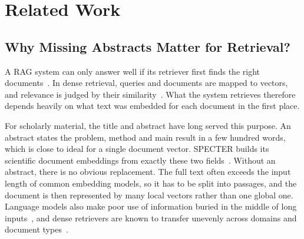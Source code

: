 \documentclass[bdcc,article,submit,pdftex,moreauthors]{Definitions/mdpi}
\begin{document}

\section{Related Work}
\label{sec:related_work}

\subsection{Why Missing Abstracts Matter for Retrieval?}

A RAG system can only answer well if its retriever first finds the right documents~\citep{lewis2020retrieval}. In dense retrieval, queries and documents are mapped to vectors, and relevance is judged by their similarity~\citep{karpukhin2020dense,reimers2019sentence}. 
What the system retrieves therefore depends heavily on what text was embedded for each document in the first place.

For scholarly material, the title and abstract have long served this purpose. An abstract states the problem, method and main result in a few hundred words, which is close to ideal for a single document vector. SPECTER builds its scientific document embeddings from exactly these two fields~\citep{cohan2020specter}. Without an abstract, there is no obvious replacement. The full text often exceeds the input length of common embedding models, so it has to be split into passages, and the document is then represented by many local vectors rather than one global one. Language models also make poor use of information buried in the middle of long inputs~\citep{liu2024lost}, and dense retrievers are known to transfer unevenly across domains and document types~\citep{thakur2021beir}.
\end{document}
